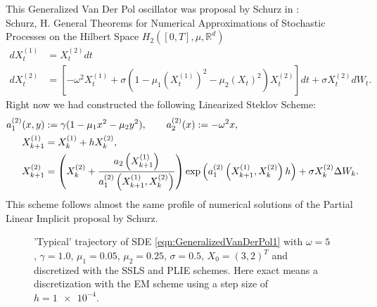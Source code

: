 This Generalized Van Der Pol oscillator was proposal by Schurz in \cite{Schurz2003}:\\
Schurz, H. General Theorems for Numerical Approximations of Stochastic Processes on the Hilbert 
Space $H_2([0,T], \mu, \mathbb{R}^d)$
\begin{align}
	dX_t^{(1)}	&= X_t^{(2)} dt\\
	dX_t^{(2)}&=
	\left[
		-\omega^2 X_t^{(1)} 
		+\sigma 
		\left(
			1 - \mu_1 \left( X_t^{(1)} \right)^2
			-\mu_2 \left( X_t \right)^2
		\right)
			X_t^{(2)}
	\right]dt
	+\sigma X_t^{(2)} dW_t \label{eqn:GeneralizedVanDerPol1}.
\end{align}
Right now we had constructed the following Linearized Steklov Scheme:
\begin{align}
	a_1^{(2)}(x,y)&:= \gamma (1-\mu_1 x^2 - \mu_2 y^2 ), \qquad
	a_2^{(2)}(x):= -\omega^2 x, \notag \\
	X_{k+1}^{(1)}&=	X_k^{(1)} + h X_k^{(2)}, \\
	X_{k+1}^{(2)}&= 
		\left(
			X_{k}^{(2)}
			+
			\frac{
					a_2
					\left(
						X_{k+1}^{(1)}
					\right)
			}
			{
				a_1^{(2)}
				\left(
					X_{k+1}^{(1)}, X_k^{(2)}
				\right)
			}
		\right)
		\exp
		\left(
			a_1^{(2)}
			\left(
				X_{k+1}^{(1)}, X_k^{(2)}
			\right) h
		\right)
		+\sigma  X_{k}^{(2)} \Delta W_k.
	\notag
\end{align}
This scheme follows almost the same profile of numerical solutions of the Partial Linear
Implicit proposal by Schurz.
\begin{figure}[htb]
\centering
	
	\caption{'Typical' trajectory of SDE \eqref{eqn:GeneralizedVanDerPol1}
		with 
		$\omega = \num{5}$, 
		$\gamma = \num{1.0}$,
		$\mu_1 = \num{0.05}$,
		$\mu_2 = \num{0.25}$,
		$\sigma = \num{0.5}$,
		$X_0 = (\num{3}, \num{2})^T$
		and discretized with the SSLS and PLIE schemes. Here exact means a discretization with the EM 
		scheme using a step size of $h=\num{1e-4}$.
	}
\label{fig:GenVanDerPolPhasePotrait}
\end{figure}



















































